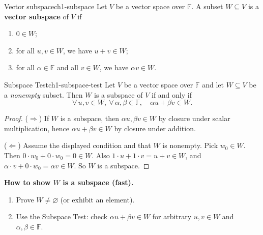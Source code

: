 \begin{definition}{Vector subspace}{ch1-subspace}
Let $V$ be a vector space over $\mathbb{F}$. A subset $W\subseteq V$ is a \textbf{vector subspace} of $V$ if
\begin{enumerate}
\item $0\in W$;
\item for all $u,v\in W$, we have $u+v\in W$;
\item for all $\alpha\in\mathbb{F}$ and all $v\in W$, we have $\alpha v\in W$.
\end{enumerate}
\end{definition}

\begin{theorem}{Subspace Test}{ch1-subspace-test}
Let $V$ be a vector space over $\mathbb{F}$ and let $W\subseteq V$ be a \emph{nonempty} subset.
Then $W$ is a subspace of $V$ if and only if
\[
\forall\,u,v\in W,\ \forall\,\alpha,\beta\in\mathbb{F},\quad \alpha u+\beta v\in W.
\]
\begin{proof}
($\Rightarrow$) If $W$ is a subspace, then $\alpha u,\beta v\in W$ by closure under scalar multiplication, hence $\alpha u+\beta v\in W$ by closure under addition.

($\Leftarrow$) Assume the displayed condition and that $W$ is nonempty. Pick $w_0\in W$.
Then $0\cdot w_0+0\cdot w_0=0\in W$. Also $1\cdot u+1\cdot v=u+v\in W$, and $\alpha\cdot v+0\cdot w_0=\alpha v\in W$. So $W$ is a subspace.
\end{proof}
\end{theorem}

\begin{keyformula}
\textbf{How to show $W$ is a subspace (fast).}
\begin{enumerate}
\item Prove $W\neq \varnothing$ (or exhibit an element).
\item Use the Subspace Test: check $\alpha u+\beta v\in W$ for arbitrary $u,v\in W$ and $\alpha,\beta\in\mathbb{F}$.
\end{enumerate}
\end{keyformula}

